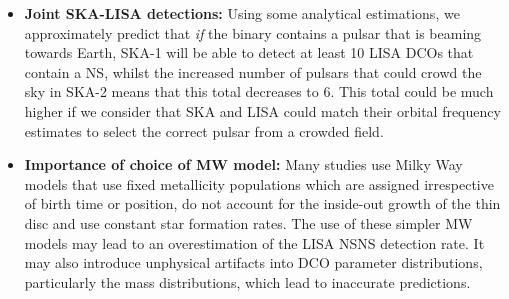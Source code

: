 \begin{itemize}
    \item \textbf{Joint SKA-LISA detections:} Using some analytical estimations, we approximately predict that \textit{if} the binary contains a pulsar that is beaming towards Earth, SKA-1 will be able to detect at least 10 LISA DCOs that contain a NS, whilst the increased number of pulsars that could crowd the sky in SKA-2 means that this total decreases to 6. This total could be much higher if we consider that SKA and LISA could match their orbital frequency estimates to select the correct pulsar from a crowded field.
    \item \textbf{Importance of choice of MW model:} Many studies use Milky Way models that use fixed metallicity populations which are assigned irrespective of birth time or position, do not account for the inside-out growth of the thin disc and use constant star formation rates. The use of these simpler MW models may lead to an overestimation of the LISA NSNS detection rate. It may also introduce unphysical artifacts into DCO parameter distributions, particularly the mass distributions, which lead to inaccurate predictions.
\end{itemize}